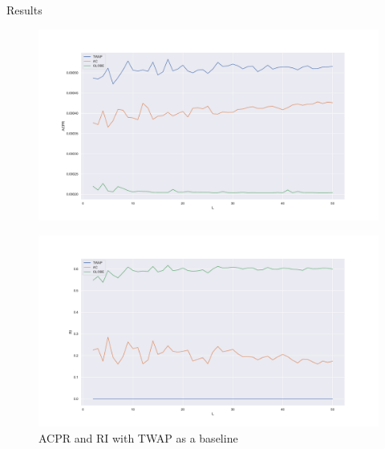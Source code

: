 \documentclass[]{beamer}
\begin{document}
\begin{frame}[t]
\begin{columns}[t]
\begin{column}{\twocolwid}
\begin{columns}[t,totalwidth=\twocolwid]
\begin{column}{\onecolwid}
    \begin{block}{Results}
    \vspace*{-1.5cm}
    \begin{figure}
        \hspace*{-1.5cm}
        \includegraphics[width=1.1\linewidth]{figures/res1.pdf}
    \end{figure}
    \vspace*{-2.5cm}
    \begin{figure}
        \hspace*{-1.5cm}
        \includegraphics[width=1.1\linewidth]{figures/res2.pdf}
        \caption{ACPR and RI with TWAP as a baseline}
    \end{figure}
    
    \end{block}
    
    
    \end{column} %
    
    \end{columns} %
    

\end{column}
\end{columns}
\end{frame}
\end{document}
